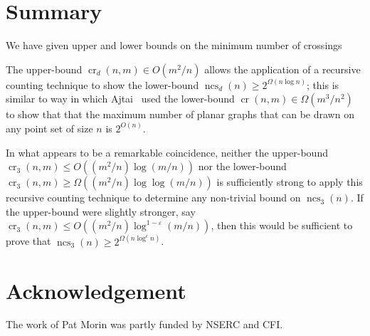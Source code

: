 \documentclass{patmorin}
\DeclareMathOperator{\crs}{cr}
\DeclareMathOperator{\ncs}{ncs}
\begin{document}
\section{Summary}

We have given upper and lower bounds on the minimum number of crossings


The upper-bound $\crs_d(n,m)\in O(m^2/n)$ allows the application of
a recursive counting technique to show the lower-bound $\ncs_d(n)\ge
2^{\Omega(n\log n)}$; this is similar to way in which Ajtai \etal\ used
the lower-bound $\crs(n,m)\in\Omega(m^3/n^2)$ to show that that the maximum
number of planar graphs that can be drawn on any point set of size $n$
is $2^{O(n)}$.

In what appears to be a remarkable coincidence, neither the upper-bound
$\crs_3(n,m)\le O((m^2/n)\log (m/n))$ nor the lower-bound $\crs_3(n,m)\ge
\Omega((m^2/n)\log\log(m/n))$ is sufficiently strong to apply this
recursive counting technique to determine any non-trivial bound
on $\ncs_3(n)$.  If the upper-bound were slightly stronger, say
$\crs_3(n,m)\le O((m^2/n)\log^{1-\varepsilon}(m/n))$, then this would
be sufficient to prove that $\ncs_3(n)\ge 2^{\Omega(n\log^{\epsilon} n)}$.

\section*{Acknowledgement}

The work of Pat Morin was partly funded by NSERC and CFI.



\end{document}

